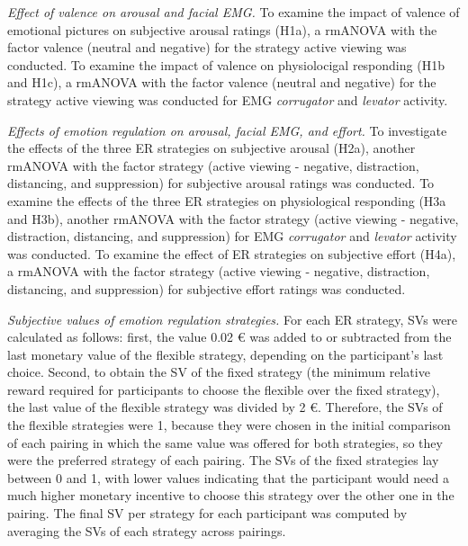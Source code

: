 \documentclass[
  man,floatsintext]{apa6}
\begin{document}
\emph{Effect of valence on arousal and facial EMG.}
To examine the impact of valence of emotional pictures on subjective arousal ratings (H1a), a rmANOVA with the factor valence (neutral and negative) for the strategy active viewing was conducted.
To examine the impact of valence on physiolocigal responding (H1b and H1c), a rmANOVA with the factor valence (neutral and negative) for the strategy active viewing was conducted for EMG \emph{corrugator} and \emph{levator} activity.

\emph{Effects of emotion regulation on arousal, facial EMG, and effort.}
To investigate the effects of the three ER strategies on subjective arousal (H2a), another rmANOVA with the factor strategy (active viewing - negative, distraction, distancing, and suppression) for subjective arousal ratings was conducted.
To examine the effects of the three ER strategies on physiological responding (H3a and H3b), another rmANOVA with the factor strategy (active viewing - negative, distraction, distancing, and suppression) for EMG \emph{corrugator} and \emph{levator} activity was conducted.
To examine the effect of ER strategies on subjective effort (H4a), a rmANOVA with the factor strategy (active viewing - negative, distraction, distancing, and suppression) for subjective effort ratings was conducted.

\emph{Subjective values of emotion regulation strategies.} For each ER strategy, SVs were calculated as follows: first, the value 0.02 € was added to or subtracted from the last monetary value of the flexible strategy, depending on the participant's last choice.
Second, to obtain the SV of the fixed strategy (the minimum relative reward required for participants to choose the flexible over the fixed strategy), the last value of the flexible strategy was divided by 2 €.
Therefore, the SVs of the flexible strategies were 1, because they were chosen in the initial comparison of each pairing in which the same value was offered for both strategies, so they were the preferred strategy of each pairing.
The SVs of the fixed strategies lay between 0 and 1, with lower values indicating that the participant would need a much higher monetary incentive to choose this strategy over the other one in the pairing.
The final SV per strategy for each participant was computed by averaging the SVs of each strategy across pairings.
\end{document}
